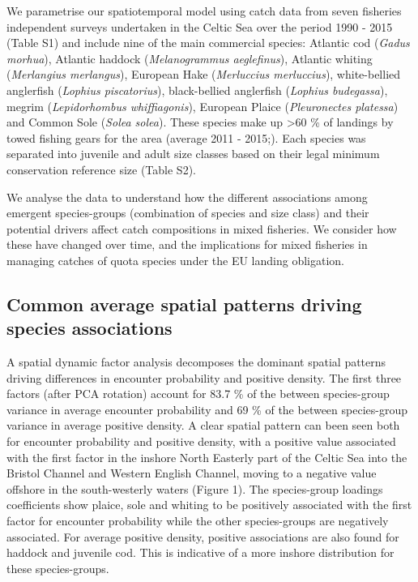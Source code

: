 \documentclass{nature}
\begin{document}
\begin{linenumbers}
We parametrise our spatiotemporal model using catch data from seven fisheries
independent surveys undertaken in the Celtic Sea over the period 1990 - 2015
(Table S1) and include nine of the main commercial species: Atlantic cod
(\textit{Gadus morhua}), Atlantic haddock (\textit{Melanogrammus aeglefinus}),
Atlantic whiting (\textit{Merlangius merlangus}), European Hake
(\textit{Merluccius merluccius}), white-bellied anglerfish (\textit{Lophius
	piscatorius}), black-bellied anglerfish (\textit{Lophius budegassa}),
megrim (\textit{Lepidorhombus whiffiagonis}), European Plaice
(\textit{Pleuronectes platessa}) and Common Sole (\textit{Solea solea}). These
species make up \textgreater 60 \% of landings by towed fishing gears for the
area (average 2011 - 2015;\cite{STECF2017}). Each species was separated into
juvenile and adult size classes based on their legal minimum conservation
reference size (Table S2).

We analyse the data to understand how the different associations among emergent
species-groups (combination of species and size class) and their potential
drivers affect catch compositions in mixed fisheries. We consider how these
have changed over time, and the implications for mixed fisheries in managing
catches of quota species under the EU landing obligation.

\subsection{Common average spatial patterns driving species associations} A
spatial dynamic factor analysis decomposes the dominant spatial patterns
driving differences in encounter probability and positive density. The first
three factors (after PCA rotation) account for 83.7 \% of the between
species-group variance in average encounter probability and 69 \% of the
between species-group variance in average positive density. A clear spatial
pattern can been seen both for encounter probability and positive density, with
a positive value associated with the first factor in the inshore North Easterly
part of the Celtic Sea into the Bristol Channel and Western English Channel,
moving to a negative value offshore in the south-westerly waters (Figure 1).
The species-group loadings coefficients show plaice, sole and whiting to be
positively associated with the first factor for encounter probability while the
other species-groups are negatively associated. For average positive density,
positive associations are also found for haddock and juvenile cod. This is
indicative of a more inshore distribution for these species-groups. 


\end{linenumbers}
\end{document}
